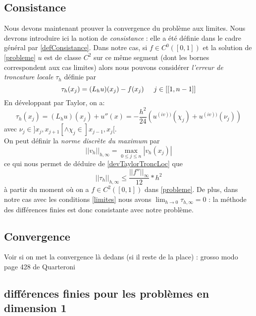 \documentclass[12pt]{article}
\newcommand{\espace}{\hspace{5mm}}
\begin{document}
\subsection{Consistance}
Nous devons maintenant prouver la convergence du problème aux limites. Nous devrons introduire ici la notion de \emph{consistance} : elle a été définie dans le cadre général par \eqref{defConsistance}. Dans notre cas, si $f \in C^0([0,1])$ et la solution de \eqref{probleme} $u$ est de classe $C^2$ sur ce même segment (dont les bornes correspondent aux cas limites) alors nous pouvons considérer \emph{l'erreur de troncature locale} $\tau_h$ définie par
\begin{equation}\label{erreurTroncatureLocale}
\tau_h(x_j) = (L_h u)(x_j) - f(x_j) \espace j \in [[1,n-1]]
\end{equation}
En développant par Taylor, on a:
\begin{equation}
\tau_h(x_j) = (L_h u)(x_j)  + u''(x) = -\frac{h^2}{24}(u^{(iv))} (\chi_j) + u^{(iv))} (\nu_j))
\end{equation} \label{devTaylorTroncLoc}
avec $\nu_j \in ]x_j, x_{j+1}[ \wedge \chi_j \in ]x_{j-1}, x_j[$.
\\ On peut définir la \emph{norme discrète du maximum} par
\begin{equation} \label{defNormeDiscreteDuMaximum}
|| v_h ||_{h, \infty}  = \max_{0 \le j \le n} |v_h(x_j)|
\end{equation}
ce qui nous permet de déduire de  \eqref{devTaylorTroncLoc} que
\begin{equation}
|| \tau_h ||_{h, \infty} \le \frac{||f''||_\infty}{12} * h^2
\end{equation}
à partir du moment où on a $f \in C^2([0,1])$ dans \eqref{probleme}. De plus, dans notre cas avec les conditions \eqref{limites} nous avons $\lim_{h \rightarrow 0} \tau_{h, \infty} = 0$ : la méthode des différences finies est donc consistante avec notre problème.

\subsection{Convergence}
 Voir si on met la convergence là dedans (si il reste de la place) : grosso modo page 428 de Quarteroni

\subsection{différences finies pour les problèmes en dimension 1}
\end{document}
